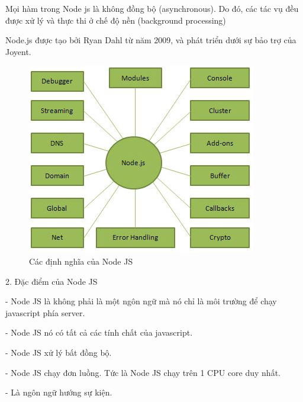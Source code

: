 \documentclass{report}
\begin{document}
Mọi hàm trong Node js là không đồng bộ (asynchronous). Do đó, các tác vụ đều được xử lý và thực thi ở chế độ nền (background processing)

Node.js được tạo bởi Ryan Dahl từ năm 2009, và phát triển dưới sự bảo trợ của Joyent.

\begin{center}
    \begin{figure}[htp]
    \begin{center}
     \includegraphics[scale=1]{nodejs_concepts.jpg}
    \end{center}
    \caption{Các định nghĩa của Node JS}
    \label{refhinh1}
    \end{figure}
\end{center}

\setlength{\parindent}{0cm}
2. Đặc điểm của Node JS

\smallskip
\setlength{\parindent}{1cm}
- Node JS là không phải là một ngôn ngữ mà nó chỉ là môi trường để chạy javascript phía server. 

- Node JS nó có tất cả các tính chất của javascript.

- Node JS xử lý bất đồng bộ.

- Node JS chạy đơn luồng. Tức là Node JS chạy trên 1 CPU core duy nhất.

- Là ngôn ngữ hướng sự kiện.
\end{document}
